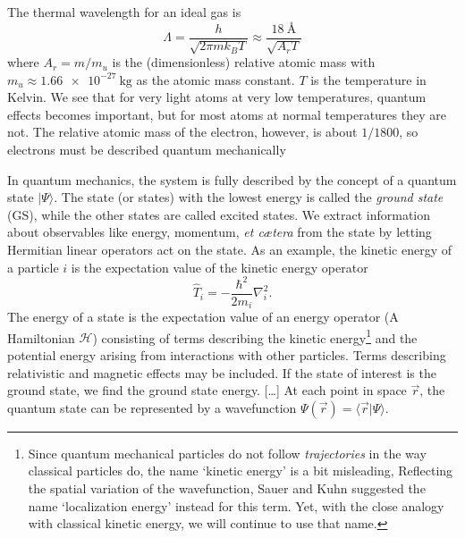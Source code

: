 \documentclass[11pt,bibliography=totoc,index=totoc]{scrbook}   %
\begin{document}
The thermal wavelength for an ideal gas is
\begin{equation}
  \Lambda = \frac{h}{\sqrt{2\pi m k_B T}} \approx \frac{\SI{18}{\angstrom}}{\sqrt{A_r T}}
\end{equation}
where $A_r=m/m_u$ is the (dimensionless) relative atomic mass with
$m_u\approx\SI{1.66e-27}{\kilogram}$ as the atomic mass constant.
$T$ is the temperature in Kelvin.
We see that for very light atoms at very low temperatures, quantum
effects becomes important, but for most atoms at normal temperatures they are not.
The relative atomic mass of the electron, however, is about $1/1800$, so 
electrons must be described quantum mechanically

In quantum mechanics, the system is fully
described by the concept of a quantum state $|\Psi\rangle$. The state (or
states) with the lowest energy is called the \emph{ground state} (GS), 
while the other states are called excited states. We extract information about 
observables like energy, momentum, \textit{et cætera} from the state by 
letting Hermitian linear operators act on the state. As an example, the 
kinetic energy of a particle $i$ is the expectation value of the kinetic 
energy operator
\begin{equation}
  \hat{T}_i = -\frac{\hbar^2}{2m_i}\nabla_i^2.
  \label{eq:kineticenergy}
\end{equation}
The energy of a state is the expectation value of an energy operator (A
Hamiltonian $\mathcal{H}$) consisting of terms describing the kinetic 
energy\footnote{Since quantum mechanical particles do not follow \emph{trajectories} 
in the way classical particles do, the name `kinetic energy' is 
a bit misleading, Reflecting the spatial variation of the wavefunction, Sauer and Kuhn suggested the 
name `localization energy' instead for this term\cite{Sauer:1982}.
Yet, with the close analogy with classical kinetic energy, we will continue to use that name.
}
and the potential energy arising from interactions with other particles.
Terms describing relativistic and magnetic effects may be included.
If the state of interest is the ground state, we find the ground state energy.
[\dots] At each point in space $\vec{r}$, the quantum state can be represented by a 
wavefunction $\Psi(\vec{r})=\langle\vec{r}|\Psi\rangle$.
\end{document}
